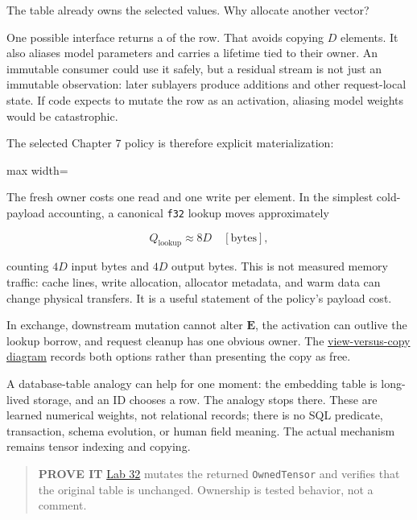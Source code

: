 \documentclass[
  10pt,
]{article}
\begin{document}
The table already owns the selected values. Why allocate another vector?

One possible interface returns a
\texttt{} of the row. That avoids copying
\(D\) elements. It also aliases model parameters and carries a lifetime
tied to their owner. An immutable consumer could use it safely, but a
residual stream is not just an immutable observation: later sublayers
produce additions and other request-local state. If code expects to
mutate the row as an activation, aliasing model weights would be
catastrophic.

The selected Chapter 7 policy is therefore explicit materialization:

\begin{center}\begin{adjustbox}{max width=\linewidth}\end{adjustbox}\end{center}

The fresh owner costs one read and one write per element. In the
simplest cold-payload accounting, a canonical \texttt{f32} lookup moves
approximately

\[
Q_{\mathrm{lookup}}\approx 8D\quad[\mathrm{bytes}],
\]

counting \(4D\) input bytes and \(4D\) output bytes. This is not
measured memory traffic: cache lines, write allocation, allocator
metadata, and warm data can change physical transfers. It is a useful
statement of the policy's payload cost.

In exchange, downstream mutation cannot alter \(\mathbf{E}\), the
activation can outlive the lookup borrow, and request cleanup has one
obvious owner. The
\href{https://github.com/hermonai/inside-the-llm-engine/blob/astra-visual-rewrite/diagrams/transformer/embedding-view-vs-copy.txt}{view-versus-copy
diagram} records both options rather than presenting the copy as free.

A database-table analogy can help for one moment: the embedding table is
long-lived storage, and an ID chooses a row. The analogy stops there.
These are learned numerical weights, not relational records; there is no
SQL predicate, transaction, schema evolution, or human field meaning.
The actual mechanism remains tensor indexing and copying.

\begin{quote}
\textbf{PROVE IT}
\href{https://github.com/hermonai/inside-the-llm-engine/blob/astra-visual-rewrite/labs/lab-32-embedding-view-vs-copy.md}{Lab
32} mutates the returned \texttt{OwnedTensor} and verifies that the
original table is unchanged. Ownership is tested behavior, not a
comment.
\end{quote}
\end{document}
